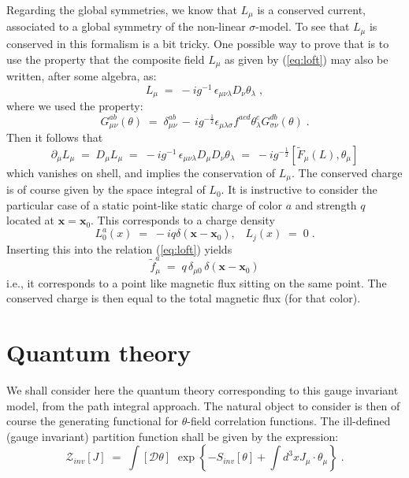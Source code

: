 \documentclass[a4paper,12pt]{article}
\begin{document}
Regarding the global symmetries, we know that $L_\mu$ is a conserved current, 
associated to a global symmetry of the non-linear $\sigma$-model. To see that 
$L_\mu$ is conserved in this formalism is a bit tricky. One possible way to
prove that is to use the property that the composite field $L_\mu$ as given 
by (\ref{eq:loft}) may also be written, after some algebra, as:
\begin{equation}\label{eq:eqlt}
L_\mu \;=\; -i g^{-1} \, \epsilon_{\mu\nu\lambda} D_\nu \theta_\lambda \;,
\end{equation}
where we used the property:
\begin{equation}
G_{\mu\nu}^{ab} (\theta) \;=\; \delta_{\mu\nu}^{ab} \,-\, i g^{-\frac{1}{2}}
\epsilon_{\mu\lambda\sigma} f^{acd} \theta_\lambda^c G_{\sigma\nu}^{db}(\theta)
\;. 
\end{equation}
Then it follows that
\begin{equation}\label{eq:global}
\partial_\mu L_\mu \;=\; D_\mu L_\mu \;=\; -i g^{-1} \, \epsilon_{\mu\nu\lambda} 
D_\mu D_\nu \theta_\lambda \;=\;  -i g^{-\frac{1}{2}} [ {\tilde F}_\mu (L),
\theta_\mu ]  
\end{equation}
which vanishes on shell, and implies the conservation of $L_\mu$.
The conserved charge is of course given by the space integral of $L_0$. It is 
instructive to consider the particular case of a static point-like static charge
of color $a$ and strength $q$ located at ${\mathbf x} = {\mathbf x}_0$. 
This corresponds to a charge density
\begin{equation}
L^a_0 (x) \;=\; - i q \delta ({\mathbf x} - {\mathbf x}_0) ,\;\;\;
L_j (x) \;=\; 0\;.
\end{equation}
Inserting this into the relation (\ref{eq:loft}) yields
\begin{equation}
{\tilde f}_\mu^a \;=\; q \, \delta_{\mu 0} \, 
\delta({\mathbf x} - {\mathbf x}_0)
\end{equation}
i.e., it corresponds to a point like magnetic flux sitting on the same point.
The conserved charge is then equal to the total magnetic flux (for that color).

\section{Quantum theory}\label{sec:quantum}
We shall consider here the quantum theory corresponding to this gauge
invariant model, from the path integral approach. The natural object to
consider is then of course the generating functional for $\theta$-field
correlation functions. The ill-defined (gauge invariant) partition function
shall be given by the expression:
\begin{equation}\label{eq:defzinv}
{\mathcal Z}_{inv}[J] \;=\; \int [{\mathcal D}\theta] \,
\,\exp \left\{- S_{inv}[\theta] + \int d^3x J_\mu \cdot \theta_\mu \right\} \;.
\end{equation}
\end{document}
